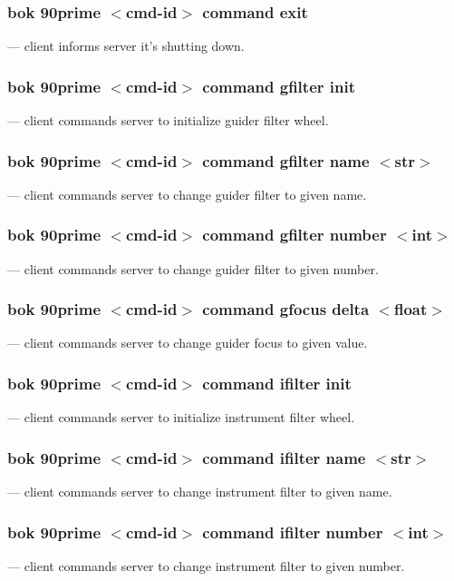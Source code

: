 \documentclass[12pt,twoside]{article}
\begin{document}
\subsubsection{bok 90prime $<$cmd-id$>$ command exit}
  --- client informs server it's shutting down.

\subsubsection{bok 90prime $<$cmd-id$>$ command gfilter init}
  --- client commands server to initialize guider filter wheel.
 
\subsubsection{bok 90prime $<$cmd-id$>$ command gfilter name $<$str$>$}
  --- client commands server to change guider filter to given name.
 
\subsubsection{bok 90prime $<$cmd-id$>$ command gfilter number $<$int$>$}
  --- client commands server to change guider filter to given number.
 
\subsubsection{bok 90prime $<$cmd-id$>$ command gfocus delta $<$float$>$}
  --- client commands server to change guider focus to given value.

\subsubsection{bok 90prime $<$cmd-id$>$ command ifilter init}
  --- client commands server to initialize instrument filter wheel.

\subsubsection{bok 90prime $<$cmd-id$>$ command ifilter name $<$str$>$}
  --- client commands server to change instrument filter to given name.

\subsubsection{bok 90prime $<$cmd-id$>$ command ifilter number $<$int$>$}
  --- client commands server to change instrument filter to given number.
 
\end{document}
